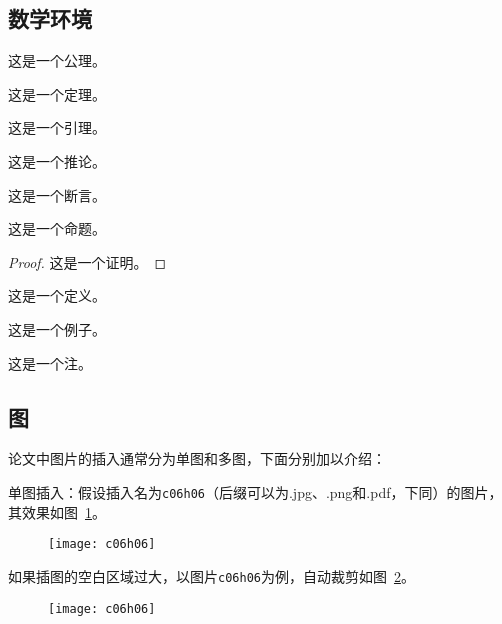 \subsection{数学环境}

\begin{axiom}
   这是一个公理。 
\end{axiom}
\begin{theorem}
   这是一个定理。 
\end{theorem}
\begin{lemma}
   这是一个引理。 
\end{lemma}
\begin{corollary}
   这是一个推论。 
\end{corollary}
\begin{assertion}
   这是一个断言。 
\end{assertion}
\begin{proposition}
   这是一个命题。 
\end{proposition}
\begin{proof}
    这是一个证明。
\end{proof}
\begin{definition}
    这是一个定义。
\end{definition}
\begin{example}
    这是一个例子。
\end{example}
\begin{remark}
    这是一个注。
\end{remark}

\subsection{图}

论文中图片的插入通常分为单图和多图，下面分别加以介绍：

单图插入：假设插入名为\verb|c06h06|（后缀可以为.jpg、.png和.pdf，下同）的图片，其效果如图~\ref{fig:c06h06}。
\begin{figure}[htbp]
    \centering
    \texttt{[image: c06h06]}
    \label{fig:c06h06}
\end{figure}

如果插图的空白区域过大，以图片\verb|c06h06|为例，自动裁剪如图~\ref{fig:c06h06_trim}。
\begin{figure}[htbp]
    \centering
    \texttt{[image: c06h06]}
    \label{fig:c06h06_trim}
\end{figure}

